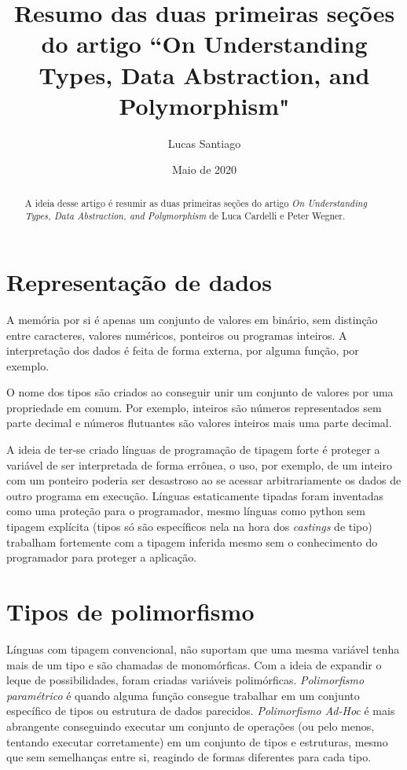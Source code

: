 \documentclass{article}
\title{Resumo das duas primeiras seções do artigo ``On Understanding Types, Data Abstraction, and Polymorphism"}
\author{Lucas Santiago}
\date{Maio de 2020}
\begin{document}
\maketitle


\begin{abstract}
    A ideia desse artigo é resumir as duas primeiras seções do artigo \emph{On Understanding Types, Data Abstraction, and Polymorphism} de Luca Cardelli e Peter Wegner.
    
\end{abstract}



\section{Representação de dados}

\hspace{10pt} A memória por si é apenas um conjunto de valores em binário, sem distinção entre caracteres, valores numéricos, ponteiros ou programas inteiros. A interpretação dos dados é feita de forma externa, por alguma função, por exemplo.

O nome dos tipos são criados ao conseguir unir um conjunto de valores por uma propriedade em comum. Por exemplo, inteiros são números representados sem parte decimal e números flutuantes são valores inteiros mais uma parte decimal.

A ideia de ter-se criado línguas de programação de tipagem forte é proteger a variável de ser interpretada de forma errônea, o uso, por exemplo, de um inteiro com um ponteiro poderia ser desastroso ao se acessar arbitrariamente os dados de outro programa em execução. 
Línguas estaticamente tipadas foram inventadas como uma proteção para o programador, mesmo línguas como python sem tipagem explícita (tipos só são específicos nela na hora dos \emph{castings} de tipo) trabalham fortemente com a tipagem inferida mesmo sem o conhecimento do programador para proteger a aplicação.

\section{Tipos de polimorfismo}

\hspace{10pt} Línguas com tipagem convencional, não suportam que uma mesma variável tenha mais de um tipo e são chamadas de monomórficas. Com a ideia de expandir o leque de possibilidades, foram criadas variáveis polimórficas. \emph{Polimorfismo paramétrico} é quando alguma função consegue trabalhar em um conjunto específico de tipos ou estrutura de dados parecidos. \emph{Polimorfismo Ad-Hoc} é mais abrangente conseguindo executar um conjunto de operações (ou pelo menos, tentando executar corretamente) em um conjunto de tipos e estruturas, mesmo que sem semelhanças entre si, reagindo de formas diferentes para cada tipo.
\end{document}
